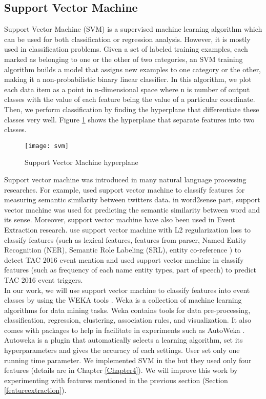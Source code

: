 \subsection{Support Vector Machine}
Support Vector Machine (SVM) is a supervised machine learning algorithm which can be used for both classification or regression analysis. However,  it is mostly used in classification problems. Given a set of labeled training examples, each marked as belonging to one or the other of two categories, an SVM training algorithm builds a model that assigns new examples to one category or the other, making it a non-probabilistic binary linear classifier. In this algorithm, we plot each data item as a point in n-dimensional space where n is number of output classes with the value of each feature being the value of a particular coordinate. Then, we perform classification by finding the hyperplane that differentiate these classes very well. Figure \ref{fig:svm} shows the hyperplane that separate features into two classes.
\begin{figure}
    \centering
    \texttt{[image: svm]}
    \caption{Support Vector Machine hyperplane}
    \label{fig:svm}
\end{figure}
Support vector machine was introduced in many natural language processing researches. For example,  \cite{satyapanich2015ebiquity} used support vector machine to classify features for measuring semantic similarity between twitters data. \cite{kashyap2016robust} in word2sense part, support vector machine was used for predicting the semantic similarity between word and its sense. Moreover, support vector machine have also been used in Event Extraction research. \cite{tsetsai2016event} use support vector machine with L2 regularization loss to classify features (such as lexical features, features from parser, Named Entity Recognition (NER), Semantic Role Labeling (SRL), entity co-reference ) to detect TAC 2016 event mention and \cite{satyapanich2016event} used support vector machine in classify features (such as frequency of each name entity types, part of speech) to predict TAC 2016 event triggers.  \\
\indent In our work, we will use support vector machine to classify features into event classes by using the WEKA tools \cite{hall2009weka}. Weka is a collection of machine learning algorithms for data mining tasks.  Weka contains tools for data pre-processing, classification, regression, clustering, association rules, and visualization. It also comes with packages to help in facilitate in experiments such as AutoWeka \cite{thornton2013auto}. Autoweka is a plugin that automatically selects a learning algorithm, set its hyperparameters and gives the accuracy of each settings. User set only one running time parameter. We implemented SVM in the \cite{satyapanich2016event}  but they used only four features (details are in Chapter \ref{Chapter4}). We will improve this work by experimenting with features mentioned in the previous section (Section \ref{featureextraction}).

